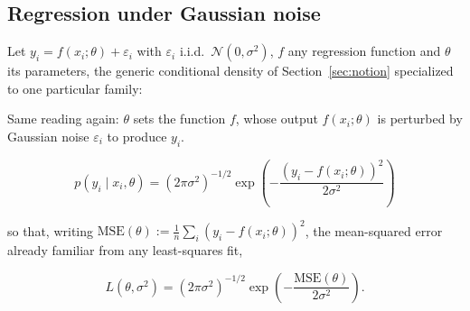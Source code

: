 \documentclass[11pt]{article}
\begin{document}
\subsection{Regression under Gaussian noise}
\label{sec:regression}

Let $y_i = f(x_i;\theta) + \varepsilon_i$ with $\varepsilon_i$ i.i.d.\
$\mathcal N(0,\sigma^2)$, $f$ any regression function and $\theta$ its
parameters, the generic conditional density of Section~\ref{sec:notion}
specialized to one particular family:

\begin{center}
\end{center}
\begin{center}
\footnotesize
Same reading again: $\theta$ sets the function $f$, whose output
$f(x_i;\theta)$ is perturbed by Gaussian noise $\varepsilon_i$ to
produce $y_i$.
\end{center}

\begin{equation}
p(y_i \mid x_i, \theta) = (2\pi\sigma^2)^{-1/2}
\exp\!\left(-\frac{(y_i - f(x_i;\theta))^2}{2\sigma^2}\right)
\end{equation}

so that, writing $\mathrm{MSE}(\theta) := \frac1n\sum_i (y_i -
f(x_i;\theta))^2$, the mean-squared error already familiar from any
least-squares fit,

\begin{equation}
L(\theta,\sigma^2) = (2\pi\sigma^2)^{-1/2}\exp\!\left(-\frac{\mathrm{MSE}(\theta)}{2\sigma^2}\right).
\end{equation}
\end{document}
